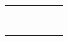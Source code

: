 \documentclass[12pt,a4paper]{article}
\begin{document}
\begin{landscape}
\begin{table}[ht!]
\begin{tabular}{|c|l|l|l|c|c|}
			                                                       &                           & \multirow{1}{*}{\gbbbb}             &              &                                                                                     &                                                                  \\\cline{2-4}
			                                                       & \multirow{6}{*}{\dimii}   & \multirow{2}{*}{\gbbbbb}            &              &                                                                                     &                                                                  \\\cline{4-4}
			                                                       &                           &                                     &              &                                                                                     &                                                                  \\\cline{3-4}
			                                                       &                           & \multirow{1}{*}{\gbbbbbb}           &              &                                                                                     &                                                                  \\\cline{3-4}
			                                                       &                           & \multirow{1}{*}{\gbbbbbbb}          &              &                                                                                     &                                                                  \\\cline{3-4}
			                                                       &                           & \multirow{2}{*}{\gbbbbbbbb}         &              &                                                                                     &                                                                  \\\cline{4-4}
			                                                       &                           &                                     &              &                                                                                     &                                                                  \\\cline{2-4}
			                                                       & \multirow{7}{*}{\dimiii}  & \multirow{2}{*}{\gbbbbbbbbb}        &              &                                                                                     &                                                                  \\\cline{4-4}

\end{tabular}
\end{table}
\end{landscape}
\end{document}
